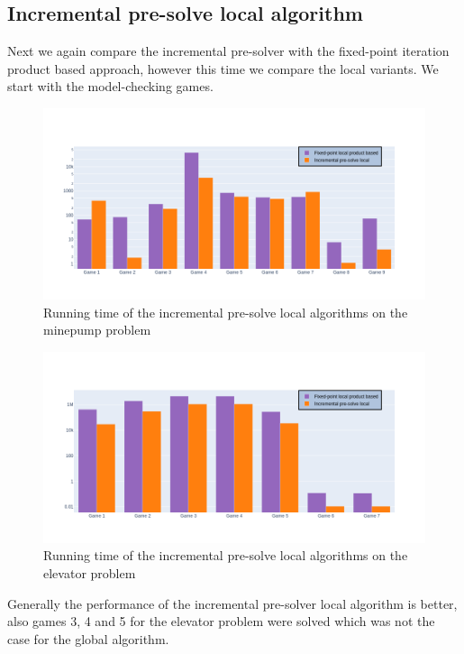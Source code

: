\subsection{Incremental pre-solve local algorithm}
Next we again compare the incremental pre-solver with the fixed-point iteration product based approach, however this time we compare the local variants. We start with the model-checking games.
\begin{figure}[H]
	\includegraphics[width=1\linewidth]{"results/minepump/Fixed-point local product based_Incremental pre-solve local_"}
	\caption{Running time of the incremental pre-solve local algorithms on the minepump problem}
	\label{fig:minepumpzlnks}
\end{figure}%
\begin{figure}[H]
	\includegraphics[width=1\linewidth]{"results/elevator/Fixed-point local product based_Incremental pre-solve local_"}
	\caption{Running time of the incremental pre-solve local algorithms on the elevator problem}
	\label{fig:elevatorzlnks}
\end{figure}%
Generally the performance of the incremental pre-solver local algorithm is better, also games 3, 4 and 5 for the elevator problem were solved which was not the case for the global algorithm.

